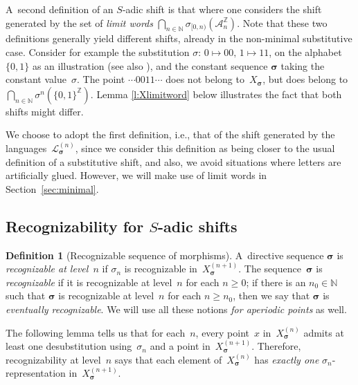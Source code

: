 \documentclass{amsart}
\theoremstyle{definition}
\newtheorem{definition}[lemma]{Definition}
\theoremstyle{remark}
\numberwithin{equation}{section}
\begin{document}
A~second definition of an $S$-adic shift is that where one considers the shift generated  by the set of {\em limit words} $\bigcap_{n\in\mathbb{N}} \sigma_{[0,n)}(\mathcal{A}_n ^\mathbb{Z})$. Note that these two definitions generally yield different shifts, already in  the non-minimal substitutive case. Consider for example the  substitution $\sigma:\, 0 \mapsto 00,\, 1 \mapsto 11$, on the alphabet $\{0,1\}$ as an illustration (see also \cite{AubSab}), and the constant sequence $\boldsymbol{\sigma}$ taking the constant value~$\sigma$.
The point $\cdots0011\cdots$ does not belong to~$X_{\boldsymbol{\sigma}}$, but does belong to  $\bigcap_{n\in\mathbb{N}} \sigma^n (\{0,1\}^\mathbb{Z})$. 
Lemma \ref{l:Xlimitword} below illustrates the fact that both shifts might differ. 


We choose to adopt the first  definition, i.e., that of the shift generated by the languages~$\mathcal{L}_{\boldsymbol{\sigma}}^{(n)}$, since we consider this definition as being  closer to the usual definition of a substitutive shift, and also, we avoid situations where letters are artificially glued. 
However, we will  make use of limit words in Section~\ref{sec:minimal}.

\subsection{Recognizability for $S$-adic shifts}\label{definition-of-S-adic-shift}

\begin{definition}[Recognizable sequence of morphisms] \label{recognizable-morphism-sequences}
A~directive sequence $\boldsymbol{\sigma}$ is \emph{recognizable at level~$n$} if $\sigma_n$ is recognizable in~$X_{\boldsymbol{\sigma}}^{(n+1)}$. 
The sequence~$\boldsymbol{\sigma}$ is \emph{recognizable} if it is recognizable at level~$n$ for each $n \ge 0$; if there is an $n_0 \in \mathbb{N}$ such that $\boldsymbol{\sigma}$ is recognizable at level~$n$ for each $n \ge n_0$, then we say that  $\boldsymbol{\sigma}$ is \emph{eventually recognizable}. 
We will use all these notions \emph{for aperiodic points} as well. 
\end{definition}

The following lemma tells us that for each~$n$, every point~$x$ in~$X_{\boldsymbol{\sigma}}^{(n)}$ admits at least one desubstitution using~$\sigma_n$ and a point in~$X_{\boldsymbol{\sigma}}^{(n+1)}$. 
Therefore, recognizability at level~$n$ says that each element of~$X_{\boldsymbol{\sigma}}^{(n)}$ has \emph{exactly one} $\sigma_n$-representation in~$X_{\boldsymbol{\sigma}}^{(n+1)}$. 
\end{document}
